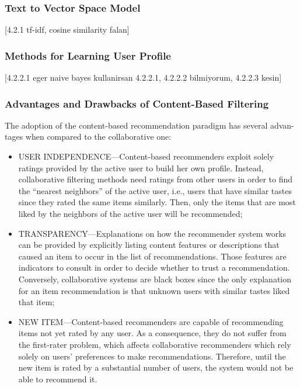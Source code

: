 \subsubsection{Text to Vector Space Model}

[4.2.1 tf-idf, cosine similarity falan]

\subsubsection{Methods for Learning User Profile}

[4.2.2.1 eger naive bayes kullanirsan 4.2.2.1, 4.2.2.2 bilmiyorum, 4.2.2.3 kesin]

\subsubsection{Advantages and Drawbacks of Content-Based Filtering}

The adoption of the content-based recommendation paradigm has several advan- tages when compared to the collaborative one:

\begin{itemize}
	\item USER INDEPENDENCE—Content-based recommenders exploit solely ratings provided by the active user to build her own profile. Instead, collaborative filtering methods need ratings from other users in order to find the “nearest neighbors” of the active user, i.e., users that have similar tastes since they rated the same items similarly. Then, only the items that are most liked by the neighbors of the active user will be recommended;
	\item TRANSPARENCY—Explanations on how the recommender system works can be provided by explicitly listing content features or descriptions that caused an item to occur in the list of recommendations. Those features are indicators to consult in order to decide whether to trust a recommendation. Conversely, collaborative systems are black boxes since the only explanation for an item recommendation is that unknown users with similar tastes liked that item;
	\item NEW ITEM—Content-based recommenders are capable of recommending items not yet rated by any user. As a consequence, they do not suffer from the first-rater problem, which affects collaborative recommenders which rely solely on users’ preferences to make recommendations. Therefore, until the new item is rated by a substantial number of users, the system would not be able to recommend it.
\end{itemize}

